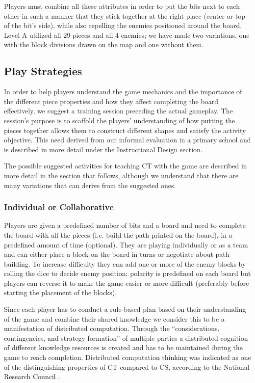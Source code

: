 \documentclass{acm_proc_article-sp}
\begin{document}
Players must combine all these attributes in order to put the bits next to each other in such a manner that they stick together at the right place (center or top of the bit's side), while also repelling the enemies positioned around the board.
Level A utilized all 29 pieces and all 4 enemies; we have made two variations, one with the block divisions drawn on the map and one without them.

\subsection{Play Strategies}
\label{sec:strategies}
In order to help players understand the game mechanics and the importance of the different piece properties and how they affect completing the board effectively, we suggest a training session preceding the actual gameplay.
The session's purpose is to scaffold the players' understanding of how putting the pieces together allows them to construct different shapes and satisfy the activity objective. This need derived from our informal evaluation in a primary school and is described in more detail under the Instructional Design section.

The possible suggested activities for teaching CT with the game are described in more detail in the section that follows, although we understand that there are many variations that can derive from the suggested ones.

\subsubsection{Individual or Collaborative}
\label{sec:collaboration}
Players are given a predefined number of bits and a board and need to complete the board with all the pieces (i.e. build the path printed on the board), in a predefined amount of time (optional).
They are playing individually or as a team and can either place a block on the board in turns or negotiate about path building.
To increase difficulty they can add one or more of the enemy blocks by rolling the dice to decide enemy position; polarity is predefined on each board but players can reverse it to make the game easier or more difficult (preferably before starting the placement of the blocks).

Since each player has to conduct a rule-based plan based on their understanding of the game and combine their shared knowledge we consider this to be a manifestation of distributed computation.
Through the ``considerations, contingencies, and strategy formation'' of multiple parties a distributed cognition of different knowledge resources is created\cite{weller2008escape} and has to be maintained during the game to reach completion.
Distributed computation thinking was indicated as one of the distinguishing properties of CT compared to CS, according to the National Research Council \cite{national2010report}.
\end{document}
